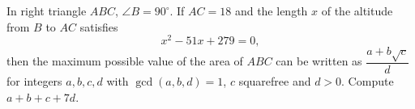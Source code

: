 In right triangle $ABC$, $\angle B=90^\circ$. If $AC=18$ and the length $x$ of the altitude from $B$ to $AC$ satisfies
\[x^2-51x+279=0,\]
then the maximum possible value of the area of $ABC$ can be written as $\dfrac{a+b\sqrt c}{d}$ for integers $a,b,c,d$ with $\gcd(a,b,d)=1$, $c$ squarefree and $d>0$. Compute $a+b+c+7d$.
